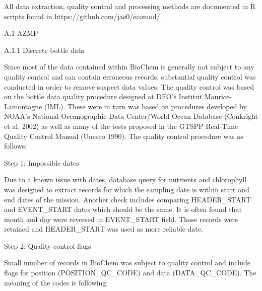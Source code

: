\documentclass[letterpaper,portrait,12pt]{scrartcl}
\numberwithin{equation}{section}		%
\numberwithin{figure}{section}			%
\numberwithin{table}{section}				%
\begin{document}
All data extraction, quality control and processing methods are documented in R scripts found in https://github.com/jae0/ecomod/.














A.1 AZMP 









A.1.1 Discrete bottle data 









Since most of the data contained within BioChem is generally not subject to any quality control and can contain erroneous records, substantial quality control was conducted in order to remove suspect data values. The quality control was based on the bottle data quality procedure designed at DFO's Institut Maurice-Lamontagne (IML). These were in turn was based on procedures developed by NOAA's National Oceanographic Data Center/World Ocean Database (Conkright et al. 2002) as well as many of the tests proposed in the GTSPP Real-Time Quality Control Manual (Unesco 1990). The quality control procedure was as follows:









Step 1: Impossible dates




Due to a known issue with dates, database query for nutrients and chlorophyll was designed to extract records for which the sampling date is within start and end dates of the mission. Another check includes comparing HEADER\_START and EVENT\_START dates which should be the same. It is often found that month and day were reversed in EVENT\_START field. Those records were retained and HEADER\_START was used as more reliable date.









Step 2: Quality control flags




Small number of records in BioChem was subject to quality control and  include flags for position (POSITION\_QC\_CODE) and data (DATA\_QC\_CODE). The meaning of the codes is following:
\end{document}
